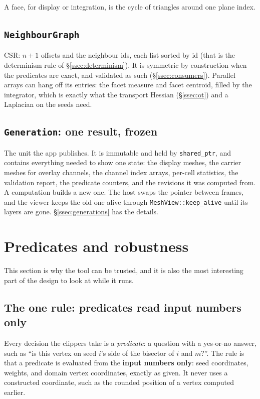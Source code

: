 \documentclass[11pt,a4paper]{article}
\newcommand{\code}[1]{\texttt{#1}}          %
\newcommand{\secref}[1]{\S\ref{#1}}
\newcommand{\Secref}[1]{\S\ref{#1}}          %
\begin{document}
A face, for display or integration, is the cycle of triangles around one plane index.

\subsection{\texorpdfstring{\code{NeighbourGraph}}{NeighbourGraph}}\label{ssec:graph}

CSR: $n+1$ offsets and the neighbour ids, each list sorted by id (that is the determinism rule of
\secref{ssec:determinism}). It is symmetric by construction when the predicates are exact, and
validated as such (\secref{ssec:consumers}). Parallel arrays can hang off its entries: the facet
measure and facet centroid, filled by the integrator, which is exactly what the transport
Hessian (\secref{ssec:ot}) and a Laplacian on the seeds need.

\subsection{\texorpdfstring{\code{Generation}}{Generation}: one result, frozen}\label{ssec:generation}

The unit the app publishes. It is immutable and held by \code{shared\_ptr}, and contains
everything needed to show one state: the display meshes, the carrier meshes for overlay
channels, the channel index arrays, per-cell statistics, the validation report, the predicate
counters, and the revisions it was computed from. A computation builds a new one. The host swaps
the pointer between frames, and the viewer keeps the old one alive through
\code{MeshView::keep\_alive} until its layers are gone. \Secref{ssec:generations} has the
details.

\section{Predicates and robustness}\label{sec:predicates}

This section is why the tool can be trusted, and it is also the most interesting part of the
design to look at while it runs.

\subsection{The one rule: predicates read input numbers only}\label{ssec:rule}

Every decision the clippers take is a \emph{predicate}: a question with a yes-or-no answer, such
as ``is this vertex on seed $i$'s side of the bisector of $i$ and $m$?''. The rule is that a
predicate is evaluated from the \textbf{input numbers only}: seed coordinates, weights, and
domain vertex coordinates, exactly as given. It never uses a constructed coordinate, such as the
rounded position of a vertex computed earlier.
\end{document}
